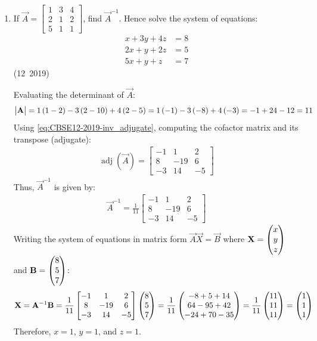 \begin{enumerate}[label=\thesubsection.\arabic*, ref=\thesubsection.\theenumi]
\item If $\vec{A} = \begin{bmatrix} 1 & 3 & 4 \\ 2 & 1 & 2 \\ 5 & 1 & 1 \end{bmatrix}$, find $\vec{A}^{-1}$. Hence solve the system of equations:
\begin{align}
	x + 3y + 4z &= 8 \\
	2x + y + 2z &= 5 \\
	5x + y + z &= 7
\end{align}
\hfill (12~2019)

\solution
Evaluating the determinant of $\vec{A}$:
\begin{align}
	\begin{vmatrix}\mathbf{A}\end{vmatrix} = 1\left(1 - 2\right) - 3\left(2 - 10\right) + 4\left(2 - 5\right) = 1\left(-1\right) - 3\left(-8\right) + 4\left(-3\right) = -1 + 24 - 12 = 11
\end{align}
Using \eqref{eq:CBSE12-2019-inv_adjugate}, computing the cofactor matrix and its transpose (adjugate):
\begin{align}
	\operatorname{adj}(\vec{A}) = \begin{bmatrix}
		-1 & 1 & 2 \\
		8 & -19 & 6 \\
		-3 & 14 & -5
	\end{bmatrix}
\end{align}
Thus, $\vec{A}^{-1}$ is given by:
\begin{align}
	\vec{A}^{-1} = \frac{1}{11}\begin{bmatrix}
		-1 & 1 & 2 \\
		8 & -19 & 6 \\
		-3 & 14 & -5
	\end{bmatrix}
\end{align}
Writing the system of equations in matrix form $\vec{A}\vec{X} = \vec{B}$ where $\mathbf{X} = \begin{pmatrix}x \\ y \\ z\end{pmatrix}$ and $\mathbf{B} = \begin{pmatrix}8 \\ 5 \\ 7\end{pmatrix}$:
\begin{align}
	\mathbf{X} = \mathbf{A}^{-1}\mathbf{B} = \frac{1}{11}\begin{bmatrix}
		-1 & 1 & 2 \\
		8 & -19 & 6 \\
		-3 & 14 & -5
	\end{bmatrix}\begin{pmatrix}8 \\ 5 \\ 7\end{pmatrix} = \frac{1}{11}\begin{pmatrix}-8 + 5 + 14 \\ 64 - 95 + 42 \\ -24 + 70 - 35\end{pmatrix} = \frac{1}{11}\begin{pmatrix}11 \\ 11 \\ 11\end{pmatrix} = \begin{pmatrix}1 \\ 1 \\ 1\end{pmatrix}
\end{align}
Therefore, $x = 1$, $y = 1$, and $z = 1$.



\end{enumerate}
